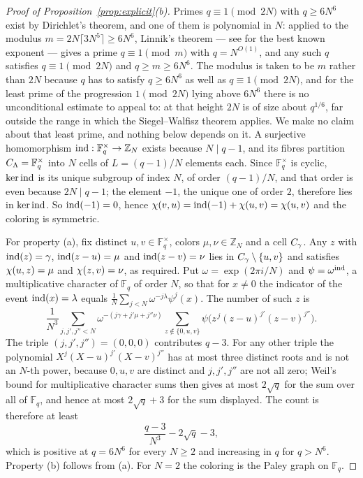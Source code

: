 \begin{proof}[Proof of Proposition~\ref{prop:explicit}(b)]
Primes $q\equiv1\pmod{2N}$ with $q\ge6N^6$ exist by Dirichlet's theorem,
and one of them is polynomial in $N$: applied to the modulus
$m=2N\lceil3N^5\rceil\ge6N^6$, Linnik's theorem \citep{linnik1944} --- see
\citet{xylouris2011} for the best known exponent --- gives a prime
$q\equiv1\pmod m$ with $q=N^{O(1)}$, and any such $q$ satisfies
$q\equiv1\pmod{2N}$ and $q\ge m\ge6N^6$. The modulus is taken to be $m$ rather than $2N$ because $q$
has to satisfy $q\ge6N^6$ as well as $q\equiv1\pmod{2N}$, and for the least
prime of the progression $1\pmod{2N}$ lying above $6N^6$ there is no
unconditional estimate to appeal to: at that height $2N$ is of size about
$q^{1/6}$, far outside the range in which the Siegel--Walfisz theorem
applies. We make no claim about that least prime, and nothing below depends
on it. A surjective homomorphism
$\operatorname{ind}:\mathbb F_q^{\times}\to\mathbb Z_N$ exists because $N\mid q-1$, and
its fibres partition $C_{\Lambda}=\mathbb F_q^{\times}$ into $N$ cells of
$L=(q-1)/N$ elements each. Since $\mathbb F_q^{\times}$ is cyclic,
$\ker\operatorname{ind}$ is its unique subgroup of index $N$, of order $(q-1)/N$, and that
order is even because $2N\mid q-1$; the element $-1$, the unique one of
order $2$, therefore lies in $\ker\operatorname{ind}$. So $\operatorname{ind}(-1)=0$, hence
$\chi(v,u)=\operatorname{ind}(-1)+\chi(u,v)=\chi(u,v)$ and the coloring is
symmetric.

For property (a), fix distinct $u,v\in\mathbb F_q^{\times}$, colors
$\mu,\nu\in\mathbb Z_N$ and a cell $C_{\gamma}$. Any $z$ with
$\operatorname{ind}(z)=\gamma$, $\operatorname{ind}(z-u)=\mu$ and $\operatorname{ind}(z-v)=\nu$ lies in
$C_{\gamma}\setminus\{u,v\}$ and satisfies $\chi(u,z)=\mu$ and
$\chi(z,v)=\nu$, as required. Put $\omega=\exp(2\pi i/N)$ and
$\psi=\omega^{\operatorname{ind}}$, a multiplicative character of $\mathbb F_q$ of order
$N$, so that for $x\ne0$ the indicator of the event $\operatorname{ind}(x)=\lambda$ equals
$\frac1N\sum_{j<N}\omega^{-j\lambda}\psi^j(x)$. The number of such $z$ is
\[
 \frac1{N^3}\sum_{j,j',j''<N}\omega^{-(j\gamma+j'\mu+j''\nu)}
 \sum_{z\notin\{0,u,v\}}\psi\bigl(z^{\,j}(z-u)^{j'}(z-v)^{j''}\bigr).
\]
The triple $(j,j',j'')=(0,0,0)$ contributes $q-3$. For any other triple the
polynomial $X^j(X-u)^{j'}(X-v)^{j''}$ has at most three distinct roots and
is not an $N$-th power, because $0,u,v$ are distinct and $j,j',j''$ are not
all zero;
Weil's bound for multiplicative character sums
\citep[Thm.~5.41]{lidl-niederreiter1997} then gives at most $2\sqrt q$ for
the sum over all of $\mathbb F_q$, and hence at most $2\sqrt q+3$ for the
sum displayed. The count is therefore at least
\[
 \frac{q-3}{N^3}-2\sqrt q-3,
\]
which is positive at $q=6N^6$ for every $N\ge2$ and increasing in $q$ for
$q>N^6$. Property (b) follows from (a). For $N=2$ the coloring is the Paley
graph on $\mathbb F_q$.
\end{proof}


